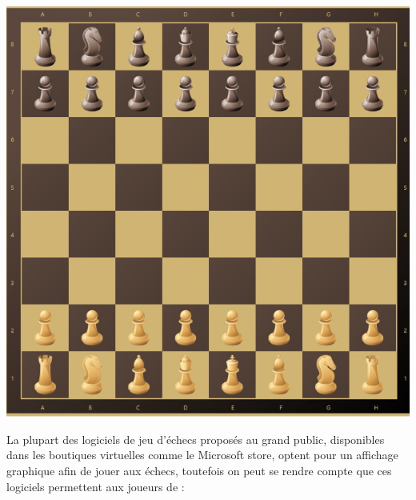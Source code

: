 \documentclass{article}
\begin{document}
\newpage
\centerline{\includegraphics[scale = 0.25]{img/Echiquier.png}}
La plupart des logiciels de jeu d'échecs proposés au grand public, disponibles dans les boutiques virtuelles comme le Microsoft store, optent pour un affichage graphique afin de jouer aux échecs, toutefois on peut se rendre compte que ces logiciels permettent aux joueurs de :
\end{document}
